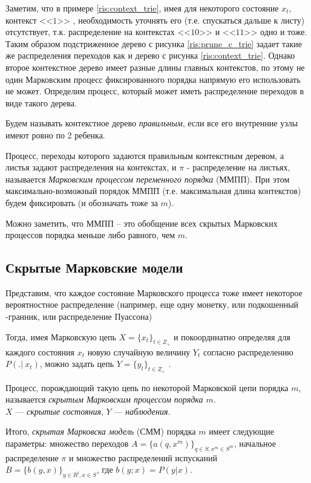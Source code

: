 \documentclass{matmex-diploma-custom}
\begin{document}
Заметим, что в примере \ref{ris:context_trie}, имея для некоторого состояние $x_{t}$, контекст  <<$1$>> , необходимость уточнять его (т.е. спускаться дальше к листу) отсутствует, т.к. распределение на контекстах  <<$10$>>  и  <<$11$>>  одно и тоже. 
Таким образом подстриженное дерево с рисунка \ref{ris:prune_c_trie} задает такие же распределения переходов как и дерево с рисунка \ref{ris:context_trie}. 
Однако второе контекстное дерево имеет разные длины главных контекстов, по этому не один Марковским процесс фиксированного порядка напрямую его использовать не может.
Определим процесс, который может иметь распределение переходов в виде такого дерева.

Будем называть контекстное дерево \textit{правильным}, если все его внутренние узлы имеют ровно по 2 ребенка.

Процесс, переходы которого задаются правильным контекстным деревом, а листья задают распределения на контекстах, и $\pi$ - распределение на листьях,  называется \textit{Марковским процессом переменного порядка} (ММПП).
При этом максимально-возможный порядок ММПП (т.е. максимальная длина контекстов) будем фиксировать (и обозначать тоже за $ m $).

Можно заметить, что ММПП -- это обобщение всех скрытых Марковских процессов порядка меньше либо равного, чем $ m $.

\subsection{Скрытые Марковские модели}
Представим, что каждое состояние Марковского процесса тоже имеет некоторое вероятностное распределение (например, еще одну монетку, или подкошенный \infty-гранник, или распределение Пуассона)

Тогда, имея Марковскую цепь $X = \{x_{t}\}_{t \in Z_{+}}$ и покоординатно определяя для каждого состояния $x_{t}$ новую случайную величину $Y_{t}$ согласно распределению $P(.|~x_{t})$, можно задать цепь
$Y = \{y_{t}\}_{t \in Z_{+}}$ .

Процесс, порождающий такую цепь по некоторой Марковской цепи порядка $m$, называется \textit{скрытым Марковским процессом порядка $m$}. 
\\
$ X $ --- \textit{скрытые состояния}, $Y$ --- \textit{наблюдения}.

Итого, \textit{скрытая Марковска модель} (СММ) порядка $ m $ имеет следующие параметры: множество переходов $ A = \{a(q, x^{m})\}_{q \in S, x^{m} \in S^{m}}$, начальное распределение $\pi$ и множество распределений испусканий $ B = \{b(y,x)\}_{y \in R^{l}, x \in S}$, где $ b(y; x) = P(y|x)$. 
\end{document}
